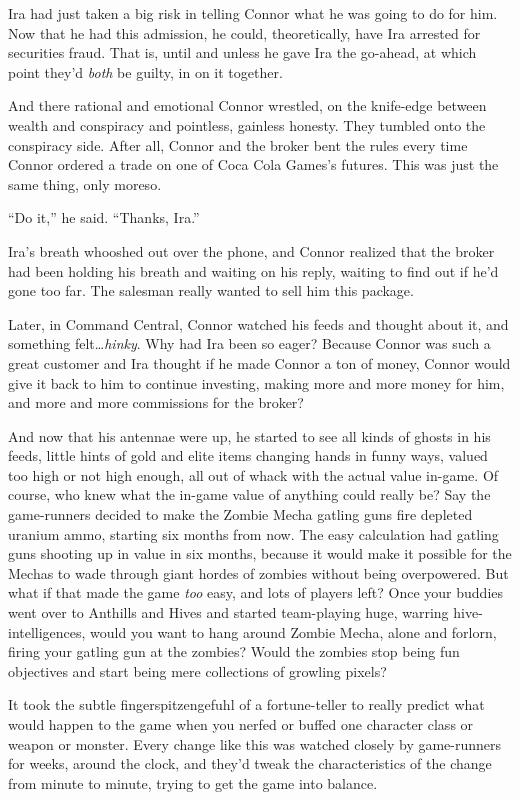 Ira had just taken a big risk in telling Connor what he was going
to do for him. Now that he had this admission, he could,
theoretically, have Ira arrested for securities fraud. That is,
until and unless he gave Ira the go-ahead, at which point they'd
\emph{both} be guilty, in on it together.

And there rational and emotional Connor wrestled, on the knife-edge
between wealth and conspiracy and pointless, gainless honesty. They
tumbled onto the conspiracy side. After all, Connor and the broker
bent the rules every time Connor ordered a trade on one of Coca
Cola Games's futures. This was just the same thing, only moreso.

``Do it,'' he said. ``Thanks, Ira.''

Ira's breath whooshed out over the phone, and Connor realized that
the broker had been holding his breath and waiting on his reply,
waiting to find out if he'd gone too far. The salesman really
wanted to sell him this package.

Later, in Command Central, Connor watched his feeds and thought
about it, and something felt\ldots{}\emph{hinky}. Why had Ira been so
eager? Because Connor was such a great customer and Ira thought if
he made Connor a ton of money, Connor would give it back to him to
continue investing, making more and more money for him, and more
and more commissions for the broker?

And now that his antennae were up, he started to see all kinds of
ghosts in his feeds, little hints of gold and elite items changing
hands in funny ways, valued too high or not high enough, all out of
whack with the actual value in-game. Of course, who knew what the
in-game value of anything could really be? Say the game-runners
decided to make the Zombie Mecha gatling guns fire depleted uranium
ammo, starting six months from now. The easy calculation had
gatling guns shooting up in value in six months, because it would
make it possible for the Mechas to wade through giant hordes of
zombies without being overpowered. But what if that made the game
\emph{too} easy, and lots of players left? Once your buddies went
over to Anthills and Hives and started team-playing huge, warring
hive-intelligences, would you want to hang around Zombie Mecha,
alone and forlorn, firing your gatling gun at the zombies? Would
the zombies stop being fun objectives and start being mere
collections of growling pixels?

It took the subtle fingerspitzengefuhl of a fortune-teller to
really predict what would happen to the game when you nerfed or
buffed one character class or weapon or monster. Every change like
this was watched closely by game-runners for weeks, around the
clock, and they'd tweak the characteristics of the change from
minute to minute, trying to get the game into balance.

